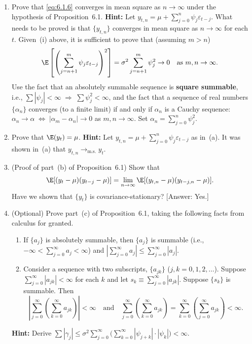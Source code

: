 \begin{problemset}
\begin{enumerate}[label=(\alph*)]
\item Prove that \eqref{eq:6.1.6} converges in mean square as $n \to \infty$ under the hypothesis
of Proposition~6.1. \textbf{Hint:} Let $y_{t,n} = \mu + \sum_{j=0}^{n} \psi_j \varepsilon_{t-j}$.
What needs to be proved is that $\{y_{t,n}\}$ converges in mean square as $n \to \infty$
for each $t$. Given~(i) above, it is sufficient to prove that (assuming $m > n$)
\[
  \E\left[\left(\sum_{j=n+1}^{m} \psi_j \varepsilon_{t-j}\right)^2\right]
  = \sigma^2 \sum_{j=n+1}^{m} \psi_j^2 \to 0 \quad \text{as } m, n \to \infty.
\]
Use the fact that an absolutely summable sequence is \textbf{square summable}, i.e.,
$\sum |\psi_j| < \infty \;\Rightarrow\; \sum \psi_j^2 < \infty$,
and the fact that a sequence of real numbers $\{\alpha_n\}$ converges (to a finite
limit) if and only if $\alpha_n$ is a Cauchy sequence:
$\alpha_n \to \alpha \;\Leftrightarrow\; |\alpha_m - \alpha_n| \to 0$ as $m, n \to \infty$.
Set $\alpha_n = \sum_{j=0}^{n} \psi_j^2$.

\item Prove that $\E(y_t) = \mu$. \textbf{Hint:} Let $y_{t,n} = \mu + \sum_{j=0}^{n} \psi_j \varepsilon_{t-j}$ as in~(a). It was
shown in~(a) that $y_{t,n} \to_{\mathrm{m.s.}} y_t$.

\item (Proof of part~(b) of Proposition~6.1) \; Show that
\[
  \E[(y_t - \mu)(y_{t-j} - \mu)] = \lim_{n \to \infty} \E[(y_{t,n} - \mu)(y_{t-j,n} - \mu)].
\]
Have we shown that $\{y_t\}$ is covariance-stationary? [Answer: Yes.]

\item (Optional) \; Prove part~(c) of Proposition~6.1, taking the following facts
from calculus for granted.
\begin{enumerate}[label=(\roman*)]
\item If $\{a_j\}$ is absolutely summable, then $\{a_j\}$ is summable (i.e., $-\infty <
\sum_{j=0}^{\infty} a_j < \infty$) and $|\sum_{j=0}^{\infty} a_j| \leq \sum_{j=0}^{\infty} |a_j|$.
\item Consider a sequence with two subscripts, $\{a_{jk}\}$ ($j, k = 0, 1, 2, \ldots$).
Suppose $\sum_{j=0}^{\infty} |a_{jk}| < \infty$ for each $k$ and let $s_k \equiv \sum_{j=0}^{\infty} |a_{jk}|$. Suppose
$\{s_k\}$ is summable. Then
\[
  \left|\sum_{j=0}^{\infty}\left(\sum_{k=0}^{\infty} a_{jk}\right)\right| < \infty
  \quad \text{and} \quad
  \sum_{j=0}^{\infty}\left(\sum_{k=0}^{\infty} a_{jk}\right) = \sum_{k=0}^{\infty}\left(\sum_{j=0}^{\infty} a_{jk}\right) < \infty.
\]
\end{enumerate}
\textbf{Hint:} Derive
$\sum |\gamma_j| \leq \sigma^2 \sum_{j=0}^{\infty}\bigl(\sum_{k=0}^{\infty} |\psi_{j+k}| \cdot |\psi_k|\bigr) < \infty$.
\end{enumerate}


\end{problemset}
